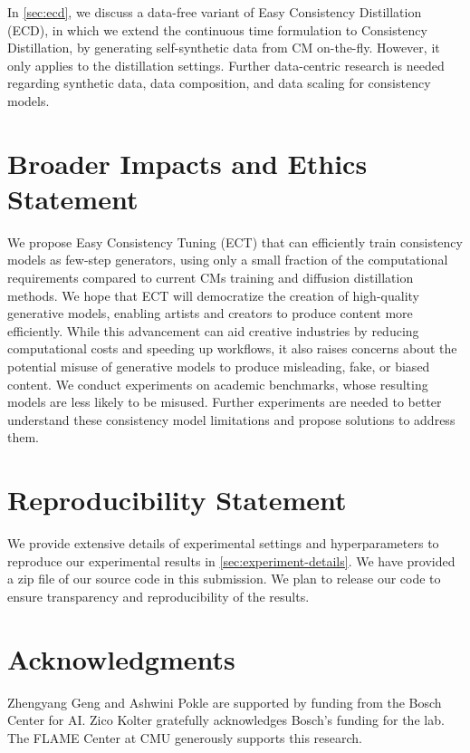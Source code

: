\documentclass{article}
\begin{document}
In \cref{sec:ecd}, we discuss a data-free variant of Easy Consistency Distillation (ECD), in which we extend the continuous time formulation to Consistency Distillation, by generating self-synthetic data from CM on-the-fly. However, it only applies to the distillation settings.
Further data-centric research is needed regarding 
synthetic data, data composition, and data scaling for consistency models.

\section*{Broader Impacts and Ethics Statement}\label{sec:broader-impact}

We propose Easy Consistency Tuning (ECT) that can efficiently train consistency models as \sota few-step generators, using only a small fraction of the computational requirements compared to current CMs training and diffusion distillation methods. 
We hope that ECT will democratize the creation of high-quality generative models, enabling artists and creators to produce content more efficiently.
While this advancement can aid creative industries by reducing computational costs and speeding up workflows, it also raises concerns about the potential misuse of generative models to produce misleading, fake, or biased content. 
We conduct experiments on academic benchmarks, whose resulting models are less likely to be misused. Further experiments are needed to better understand these consistency model limitations and propose solutions to address them.



\section*{Reproducibility Statement}\label{sec:reproducibility}
We provide extensive details of experimental settings and hyperparameters to reproduce our experimental results in \cref{sec:experiment-details}. We have provided a zip file of our source code in this submission. We plan to release our code to ensure transparency and reproducibility of the results. 


\section*{Acknowledgments}
Zhengyang Geng and Ashwini Pokle are supported by funding from the Bosch Center for AI. Zico Kolter gratefully acknowledges Bosch's funding for the lab. The FLAME Center at CMU generously supports this research.
\end{document}
